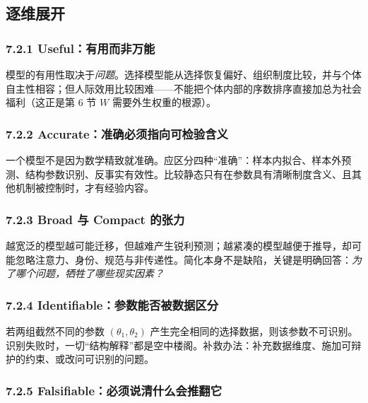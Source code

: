\subsection{逐维展开}



\subsubsection*{7.2.1 Useful：有用而非万能}


模型的有用性取决于\emph{问题}。选择模型能从选择恢复偏好、组织制度比较，并与个体自主性相容；但人际效用比较困难——不能把个体内部的序数排序直接加总为社会福利（这正是第 6 节 $W$ 需要外生权重的根源）。



\subsubsection*{7.2.2 Accurate：准确必须指向可检验含义}


一个模型不是因为数学精致就准确。应区分四种“准确”：样本内拟合、样本外预测、结构参数识别、反事实有效性。比较静态只有在参数具有清晰制度含义、且其他机制被控制时，才有经验内容。



\subsubsection*{7.2.3 Broad 与 Compact 的张力}


越宽泛的模型越可能迁移，但越难产生锐利预测；越紧凑的模型越便于推导，却可能忽略注意力、身份、规范与非传递性。简化本身不是缺陷，关键是明确回答：\emph{为了哪个问题，牺牲了哪些现实因素？}



\subsubsection*{7.2.4 Identifiable：参数能否被数据区分}


若两组截然不同的参数 $(\theta_1,\theta_2)$ 产生完全相同的选择数据，则该参数不可识别。识别失败时，一切“结构解释”都是空中楼阁。补救办法：补充数据维度、施加可辩护的约束、或改问可识别的问题。



\subsubsection*{7.2.5 Falsifiable：必须说清什么会推翻它}


